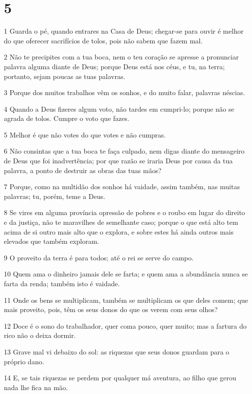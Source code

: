 \chapter{5}

\par 1 Guarda o pé, quando entrares na Casa de Deus; chegar-se para ouvir é melhor do que oferecer sacrifícios de tolos, pois não sabem que fazem mal.
\par 2 Não te precipites com a tua boca, nem o teu coração se apresse a pronunciar palavra alguma diante de Deus; porque Deus está nos céus, e tu, na terra; portanto, sejam poucas as tuas palavras.
\par 3 Porque dos muitos trabalhos vêm os sonhos, e do muito falar, palavras néscias.
\par 4 Quando a Deus fizeres algum voto, não tardes em cumpri-lo; porque não se agrada de tolos. Cumpre o voto que fazes.
\par 5 Melhor é que não votes do que votes e não cumpras.
\par 6 Não consintas que a tua boca te faça culpado, nem digas diante do mensageiro de Deus que foi inadvertência; por que razão se iraria Deus por causa da tua palavra, a ponto de destruir as obras das tuas mãos?
\par 7 Porque, como na multidão dos sonhos há vaidade, assim também, nas muitas palavras; tu, porém, teme a Deus.
\par 8 Se vires em alguma província opressão de pobres e o roubo em lugar do direito e da justiça, não te maravilhes de semelhante caso; porque o que está alto tem acima de si outro mais alto que o explora, e sobre estes há ainda outros mais elevados que também exploram.
\par 9 O proveito da terra é para todos; até o rei se serve do campo.
\par 10 Quem ama o dinheiro jamais dele se farta; e quem ama a abundância nunca se farta da renda; também isto é vaidade.
\par 11 Onde os bens se multiplicam, também se multiplicam os que deles comem; que mais proveito, pois, têm os seus donos do que os verem com seus olhos?
\par 12 Doce é o sono do trabalhador, quer coma pouco, quer muito; mas a fartura do rico não o deixa dormir.
\par 13 Grave mal vi debaixo do sol: as riquezas que seus donos guardam para o próprio dano.
\par 14 E, se tais riquezas se perdem por qualquer má aventura, ao filho que gerou nada lhe fica na mão.
